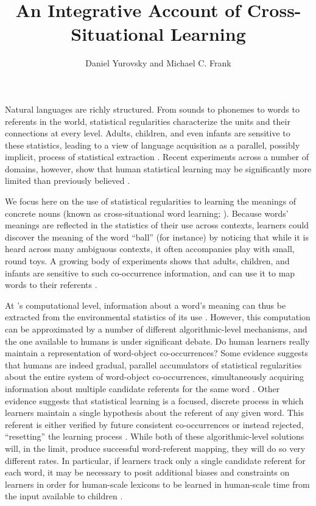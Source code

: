 \documentclass[man,floatsintext]{apa6}
\title{An Integrative Account of Cross-Situational Learning}
\author{Daniel Yurovsky and Michael C. Frank}
\affiliation{Department of Psychology, Stanford University}
\begin{document}
\maketitle

Natural languages are richly structured. From sounds to phonemes to words to referents in the world, statistical regularities characterize the units and their connections at every level. Adults, children, and even infants are sensitive to these statistics, leading to a view of language acquisition as a parallel, possibly implicit, process of statistical extraction \cite{Saffran1996a, Gomez2000}. Recent experiments across a number of domains, however, show that human statistical learning may be significantly more limited than previously believed \cite{Johnson2010c, Yurovsky2012c, Trueswell2013}.

We focus here on the use of statistical regularities to learning the meanings of concrete nouns (known as cross-situational word learning;  ). Because words' meanings are reflected in the statistics of their use across contexts, learners could discover the meaning of the word ``ball'' (for instance) by noticing that while it is heard across many ambiguous contexts, it often accompanies play with small, round toys. A growing body of experiments shows that adults, children, and infants are sensitive to such co-occurrence information, and can use it to map words to their referents \cite{Yu2007, Smith2008, Scott2012, Vlach2013}.

At \citeauthor{Marr1982}'s \citeyear{Marr1982} computational level, information about a word's meaning can thus be extracted from the environmental statistics of its use \cite{Frank2009a}. However, this computation can be approximated by a number of different algorithmic-level mechanisms, and the one available to humans is under significant debate. Do human learners really maintain a representation of word-object co-occurrences? Some evidence suggests that humans are indeed gradual, parallel accumulators of statistical regularities about the entire system of word-object co-occurrences, simultaneously acquiring information about multiple candidate referents for the same word \cite{Vouloumanos2008, McMurray2012, Yurovsky2014}. Other evidence suggests that statistical learning is a focused, discrete process in which learners maintain a single hypothesis about the referent of any given word. This referent is either verified by future consistent co-occurrences or instead rejected, ``resetting'' the learning process \cite{Medina2011, Trueswell2013}. While both of these algorithmic-level solutions will, in the limit, produce successful word-referent mapping, they will do so very different rates. In particular, if learners track only a single candidate referent for each word, it may be necessary to posit additional biases and constraints on learners in order for human-scale lexicons to be learned in human-scale time from the input available to children \cite{Vogt2012, Reisenauer2013}.
\end{document}
